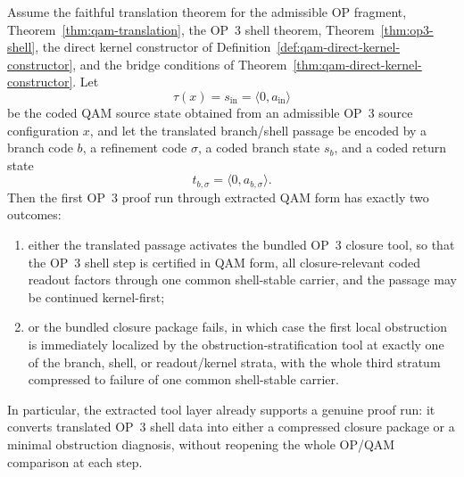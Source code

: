 \begin{theorem}\label{thm:qam-op3-proof-run}
Assume the faithful translation theorem for the admissible OP fragment, Theorem~\ref{thm:qam-translation}, the OP~3 shell theorem, Theorem~\ref{thm:op3-shell}, the direct kernel constructor of Definition~\ref{def:qam-direct-kernel-constructor}, and the bridge conditions of Theorem~\ref{thm:qam-direct-kernel-constructor}. Let
\[
\tau(x)=s_{\mathrm{in}}=\langle 0,a_{\mathrm{in}}\rangle
\]
be the coded QAM source state obtained from an admissible OP~3 source configuration $x$, and let the translated branch/shell passage be encoded by a branch code $b$, a refinement code $\sigma$, a coded branch state $s_b$, and a coded return state
\[
t_{b,\sigma}=\langle 0,a_{b,\sigma}\rangle.
\]
Then the first OP~3 proof run through extracted QAM form has exactly two outcomes:
\begin{enumerate}[leftmargin=2em,label=(\roman*)]
 \item either the translated passage activates the bundled OP~3 closure tool, so that the OP~3 shell step is certified in QAM form, all closure-relevant coded readout factors through one common shell-stable carrier, and the passage may be continued kernel-first;
 \item or the bundled closure package fails, in which case the first local obstruction is immediately localized by the obstruction-stratification tool at exactly one of the branch, shell, or readout/kernel strata, with the whole third stratum compressed to failure of one common shell-stable carrier.
\end{enumerate}
In particular, the extracted tool layer already supports a genuine proof run: it converts translated OP~3 shell data into either a compressed closure package or a minimal obstruction diagnosis, without reopening the whole OP/QAM comparison at each step.
\end{theorem}

